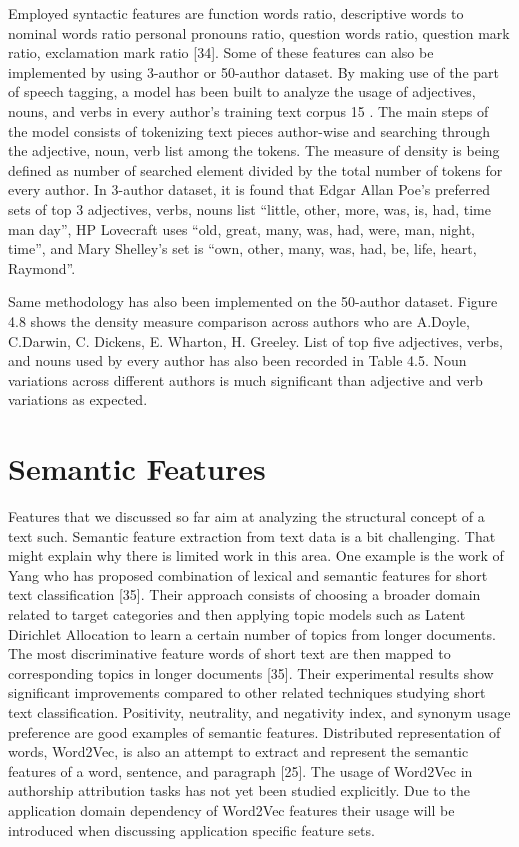 Employed syntactic features are function words ratio, descriptive words to nominal words ratio personal pronouns ratio, question words ratio, question mark ratio, exclamation
mark ratio [34]. Some of these features can also be implemented by using 3-author
or 50-author dataset.
By making use of the part of speech tagging, a model has been built to analyze the
usage of adjectives, nouns, and verbs in every author’s training text corpus
15
. The
main steps of the model consists of tokenizing text pieces author-wise and searching
through the adjective, noun, verb list among the tokens. The measure of density is
being defined as number of searched element divided by the total number of tokens
for every author. In 3-author dataset, it is found that Edgar Allan Poe’s preferred
sets of top 3 adjectives, verbs, nouns list “little, other, more, was, is, had, time man
day”, HP Lovecraft uses “old, great, many, was, had, were, man, night, time”, and
Mary Shelley’s set is “own, other, many, was, had, be, life, heart, Raymond”.

Same methodology has also been implemented on the 50-author dataset. Figure 4.8 shows the density measure comparison across authors who are A.Doyle, C.Darwin, C. Dickens, E. Wharton, H. Greeley. List of top five adjectives, verbs, and nouns used by every author has also been recorded in Table 4.5. Noun variations across different authors is much significant than adjective and verb variations as expected.

\section{Semantic Features}
Features that we discussed so far aim at analyzing the structural concept of a text
such. Semantic feature extraction from text data is a bit challenging. That might
explain why there is limited work in this area. One example is the work of Yang who
has proposed combination of lexical and semantic features for short text classification
[35]. Their approach consists of choosing a broader domain related to target categories
and then applying topic models such as Latent Dirichlet Allocation to learn a certain
number of topics from longer documents. The most discriminative feature words
of short text are then mapped to corresponding topics in longer documents [35].
Their experimental results show significant improvements compared to other related
techniques studying short text classification.
Positivity, neutrality, and negativity index, and synonym usage preference are
good examples of semantic features. Distributed representation of words, Word2Vec,
is also an attempt to extract and represent the semantic features of a word, sentence,
and paragraph [25]. The usage of Word2Vec in authorship attribution tasks has not
yet been studied explicitly. Due to the application domain dependency of Word2Vec
features their usage will be introduced when discussing application specific feature
sets.

